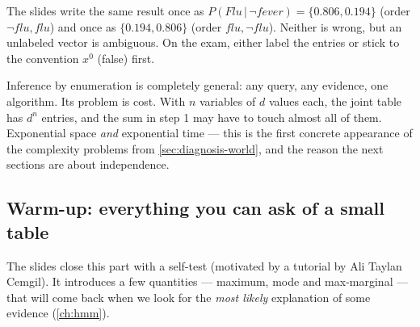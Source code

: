 \documentclass[11pt, oneside]{book}
\newcommand{\Prob}{\mathbb{P}}           %
\newcommand{\given}{\,\vert\,}           %
\newcommand{\vn}[1]{\mathit{#1}}         %
\let\originalsubsection\subsection
\renewcommand{\subsection}{\Needspace{6\baselineskip}\originalsubsection}
\begin{document}
\begin{notebox}[title={Always label the entries of a distribution}, unbreakable]
The slides write the same result once as $P(\vn{Flu} \given \neg\vn{fever}) =
\{0.806, 0.194\}$ (order $\neg\vn{flu}, \vn{flu}$) and once as $\{0.194,
0.806\}$ (order $\vn{flu}, \neg\vn{flu}$). Neither is wrong, but an unlabeled
vector is ambiguous. On the exam, either label the entries or stick to the
convention $x^0$ (false) first.
\end{notebox}

Inference by enumeration is completely general: any query, any evidence, one
algorithm. Its problem is cost. With $n$ variables of $d$ values each, the
joint table has $d^n$ entries, and the sum in step 1 may have to touch almost
all of them. Exponential space \emph{and} exponential time --- this is the
first concrete appearance of the complexity problems from
\cref{sec:diagnosis-world}, and the reason the next sections are about
independence.

\subsection{Warm-up: everything you can ask of a small table}

The slides close this part with a self-test (motivated by a tutorial by Ali
Taylan Cemgil). It introduces a few quantities --- maximum, mode and
max-marginal --- that will come back when we look for the \emph{most likely}
explanation of some evidence (\cref{ch:hmm}).
\end{document}
